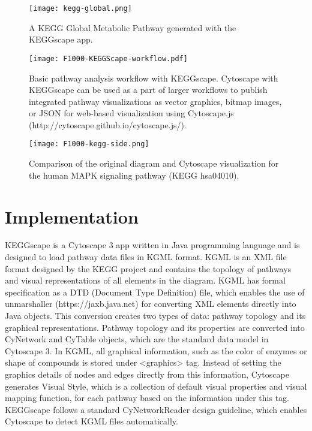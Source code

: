 \documentclass[10pt,a4paper,twocolumn]{article}
\begin{document}
\begin{figure}
\centering
\texttt{[image: kegg-global.png]}
\caption{\label{kegg-global}A KEGG Global Metabolic Pathway generated with the KEGGscape app.}
\end{figure}

\begin{figure*}[htb]
\centering
\texttt{[image: F1000-KEGGScape-workflow.pdf]}
\caption{Basic pathway analysis workflow with KEGGscape.  Cytoscape with KEGGscape can be used as a part of larger workflows to publish integrated pathway visualizations as vector graphics, bitmap images, or JSON for web-based visualization using Cytoscape.js (http://cytoscape.github.io/cytoscape.js/).}
\label{workflow}
\end{figure*}

\begin{figure*}[htb]
\centering
\texttt{[image: F1000-kegg-side.png]}
\caption{Comparison of the original diagram and Cytoscape visualization for the human MAPK signaling pathway (KEGG hsa04010).}
\label{comparison}
\end{figure*}


\section*{Implementation}
KEGGscape is a Cytoscape 3 app written in Java programming language and is designed to load pathway data files in KGML format.  KGML is an XML file format designed by the KEGG project and contains the topology of pathways and visual representations of all elements in the diagram. KGML has formal specification as a DTD (Document Type Definition) file, which enables the use of unmarshaller (https://jaxb.java.net) for converting XML elements directly into Java objects. This conversion creates two types of data: pathway topology and its graphical representations.  Pathway topology and its properties are converted into CyNetwork and CyTable objects, which are the standard data model in Cytoscape 3. In KGML, all graphical information, such as the color of enzymes or shape of compounds is stored under <graphics> tag. Instead of setting the graphics details of nodes and edges directly from this information, Cytoscape generates Visual Style, which is a collection of default visual properties and visual mapping function, for each pathway based on the information under this tag. KEGGscape follows a standard CyNetworkReader design guideline, which enables Cytoscape to detect KGML files automatically.
\end{document}

